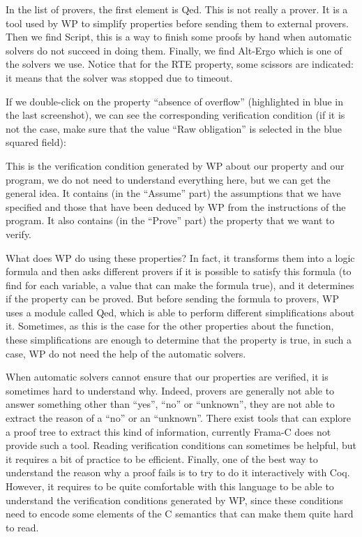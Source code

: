 In the list of provers, the first element is Qed. This is not really a prover.
It is a tool used by WP to simplify properties before sending them to external
provers. Then we find Script, this is a way to finish some proofs by hand when
automatic solvers do not succeed in doing them. Finally, we find Alt-Ergo
which is one of the solvers we use. Notice that for the RTE property, some
scissors are indicated: it means that the solver was stopped due to timeout.



If we double-click on the property ``absence of overflow''
(highlighted in blue in the last screenshot), we can see the corresponding
verification condition (if it is not the case, make sure that the value ``Raw
obligation'' is selected in the blue squared field):





This is the verification condition generated by WP about our property and our
program, we do not need to understand everything here, but we can get the
general idea. It contains (in the ``Assume'' part) the assumptions that
we have specified and those that have been deduced by WP from the
instructions of the program. It also contains (in the ``Prove'' part)
the property that we want to verify.



What does WP do using these properties? In fact, it transforms them
into a logic formula and then asks different provers if it is
possible to satisfy this formula (to find for each variable, a value
that can make the formula true), and it determines if the property can
be proved. But before sending the formula to provers, WP uses a module
called Qed, which is able to perform different simplifications about it.
Sometimes, as this is the case for the other properties about the
 function, these simplifications are enough to determine that
the property is true, in such a case, WP do not need the help of the
automatic solvers.



When automatic solvers cannot ensure that our properties are verified,
it is sometimes hard to understand why. Indeed, provers are generally
not able to answer something other than ``yes'', ``no'' or ``unknown'',
they are not able to extract the reason of a ``no'' or an ``unknown''.
There exist tools that can explore a proof tree to extract this kind of
information, currently Frama-C does not provide such a tool. Reading
verification conditions can sometimes be helpful, but it requires a bit of
practice to be efficient. Finally, one of the best way to understand the reason
why a proof fails is to try to do it interactively with Coq. However, it
requires to be quite comfortable with this language to be able to understand
the verification conditions generated by WP, since these conditions
need to encode some elements of the C semantics that can make them quite
hard to read.



